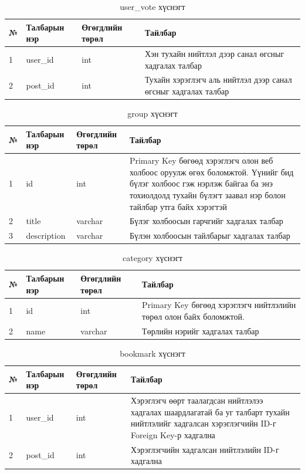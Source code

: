 \begin{table}[h]
	\caption{user\_vote хүснэгт}
	\begin{tabular}{|l|l|l|p{8cm}|}
	\hline
	№ &  Талбарын нэр & Өгөгдлийн төрөл & Тайлбар \\ \hline
	1 &  user\_id & int & Хэн тухайн нийтлэл дээр санал өгсныг хадгалах талбар \\ \hline
	2 &  post\_id & int & Тухайн хэрэглэгч аль нийтлэл дээр санал өгсныг хадгалах талбар \\ \hline

\end{tabular}
\end{table}

\begin{table}[h]
	\caption{group хүснэгт}
	\begin{tabular}{|l|l|l|p{8cm}|}
	\hline
	№ &  Талбарын нэр & Өгөгдлийн төрөл & Тайлбар \\ \hline
	1 &  id & int & Primary Key бөгөөд хэрэглэгч олон веб холбоос оруулж өгөх боломжтой. Үүнийг бид бүлэг холбоос гэж нэрлэж байгаа ба энэ тохиолдолд тухайн бүлэгт заавал нэр болон тайлбар утга байх хэрэгтэй \\ \hline
	2 &  title & varchar & Бүлэг холбоосын гарчгийг хадгалах талбар \\ \hline
	3 &  description & varchar & Бүлэн холбоосын тайлбарыг хадгалах талбар \\ \hline

\end{tabular}
\end{table}

\begin{table}[h]
	\caption{category хүснэгт}
	\begin{tabular}{|l|l|l|p{8cm}|}
	\hline
	№ &  Талбарын нэр & Өгөгдлийн төрөл & Тайлбар \\ \hline
	1 &  id & int & Primary Key бөгөөд хэрэглэгч нийтлэлийн төрөл олон байх боломжтой. \\ \hline
	2 &  name & varchar & Төрлийн нэрийг хадгалах талбар \\ \hline

\end{tabular}
\end{table}

\begin{table}[h]
	\caption{bookmark хүснэгт}
	\begin{tabular}{|l|l|l|p{8cm}|}
	\hline
	№ &  Талбарын нэр & Өгөгдлийн төрөл & Тайлбар \\ \hline
	1 &  user\_id & int & Хэрэглэгч өөрт таалагдсан нийтлэлээ хадгалах шаардлагатай ба уг талбарт тухайн нийтлэлийг хадгалсан хэрэглэгчийн ID-г Foreign Key-р хадгална \\ \hline
	2 &  post\_id & int & Хэрэглэгчийн хадгалсан нийтлэлийн ID-г хадгална \\ \hline

\end{tabular}
\end{table}


